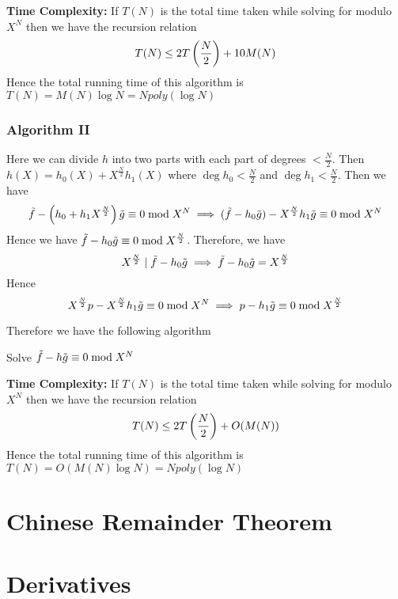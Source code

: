 \textbf{Time Complexity:} If $T(N)$ is the total time taken while solving for modulo $X^{N}$ then we have the recursion relation $$T(N)\leq 2T\left(\frac{N}2\right)+10M(N)$$Hence the total running time of this algorithm is $T(N)=M(N)\log N=Npoly(\log N)$\parinn
\subsubsection{Algorithm II}
Here we can divide $h$ into two parts with each part of degrees $< \frac{N}2$. Then $h(X)=h_0(X)+X^{\frac{N}2}h_1(X)$ where $\deg h_0<\frac{N}2$ and $\deg h_1<\frac{N}2$. Then we have 
$$
	\tilde{f}-\left(h_0+h_1X^{\frac{N}2}\right)\tilde{g}\equiv 0\bmod{X^N} \implies (\tilde{f}-h_0\tilde{g})-X^{\frac{N}2}h_1\tilde{g}\equiv 0 \bmod{X^N} $$Hence we have $\tilde{f}-h_0\tilde{g}\equiv 0\bmod{X^{\frac{N}2}}$. Therefore, we have $$X^{\frac{N}2}\mid \tilde{f}-h_0\tilde{g}\implies \tilde{f}-h_0\tilde{g}=X^{\frac{N}2}$$ Hence $$X^{\frac{N}2}p-X^{\frac{N}2}h_1\tilde{g}\equiv 0\bmod{X^{N}}\implies p-h_1\tilde{g}\equiv 0\bmod{X^{\frac{N}2}}$$
	
	\newpage Therefore we have the following algorithm

\begin{algorithm}
	\DontPrintSemicolon
	\caption{Solve $\tilde{f}-h\tilde{g}\equiv 0\bmod {X^N}$}
\end{algorithm}\parinf\vspace{5mm}

\textbf{Time Complexity:} If $T(N)$ is the total time taken while solving for modulo $X^{N}$ then we have the recursion relation $$T(N)\leq 2T\left(\frac{N}2\right)+O(M(N))$$Hence the total running time of this algorithm is $T(N)=O(M(N)\log N)=Npoly(\log N)$\parinn


\section{Chinese Remainder Theorem}

\section{Derivatives}